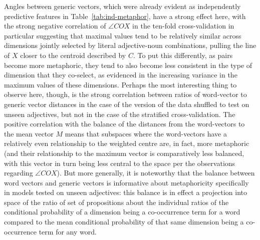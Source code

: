 Angles between generic vectors, which were already evident as independently predictive features in Table~\ref{tab:ind-metaphor}, have a strong effect here, with the strong negative correlation of $\angle COX$ in the ten-fold cross-validation in particular suggesting that maximal values tend to be relatively similar across dimensions jointly selected by literal adjective-noun combinations, pulling the line of $X$ closer to the centroid described by $C$.  To put this differently, as pairs become more metaphoric, they tend to also become less consistent in the type of dimension that they co-select, as evidenced in the increasing variance in the maximum values of these dimensions.  Perhaps the most interesting thing to observe here, though, is the strong correlation between ratios of word-vector to generic vector distances in the case of the version of the data shuffled to test on unseen adjectives, but not in the case of the stratified cross-validation.  The positive correlation with the balance of the distances from the word-vectors to the mean vector $M$ means that subspaces where the word-vectors have a relatively even relationship to the weighted centre are, in fact, more metaphoric (and their relationship to the maximum vector is comparatively less balanced, with this vector in turn being less central to the space per the observations regarding $\angle COX$).  But more generally, it is noteworthy that the balance between word vectors and generic vectors is informative about metaphoricity specifically in models tested on unseen adjectives: this balance is in effect a projection into space of the ratio of set of propositions about the individual ratios of the conditional probability of a dimension being a co-occurrence term for a word compared to the mean conditional probability of that same dimension being a co-occurrence term for any word.

